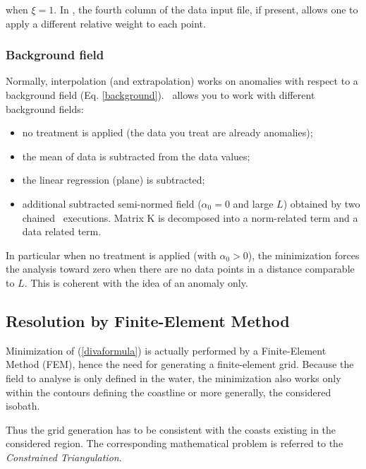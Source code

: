 when $\xi=1$. In  \diva, the fourth column of the data input file, if present, allows one 
to apply a different relative weight to each point. 


\subsubsection{Background field\label{sec:backgroundfield}}

Normally, interpolation (and extrapolation) works on anomalies with respect to a background field (Eq. \ref{background}). \diva\, allows you to work with different background fields:

\begin{itemize}
\item no treatment is applied (the data you treat are already anomalies);
\item the mean of data is subtracted from the data values;
\item the linear regression (plane) is subtracted;
\item additional subtracted semi-normed field ($\alpha_0=0$ and large $L$) obtained by two chained \diva\, executions. Matrix K is decomposed into a norm-related term and a data related term.
\end{itemize}

In particular when no treatment is applied (with $\alpha_0 > 0$), the minimization forces the analysis toward zero when there are no
data points in a distance comparable to $L$. This is coherent with the idea of an anomaly only.

\subsection{Resolution by Finite-Element Method}

Minimization of (\ref{divaformula}) is actually performed by a Finite-Element Method (FEM), hence the need for generating a finite-element grid. 
Because the field to analyse is only defined in the water, the minimization also works only within the contours defining the coastline or more generally, the considered isobath.

Thus the grid generation has to be consistent with the coasts existing in the considered region. The corresponding mathematical problem is referred to the \textit{Constrained Triangulation}. %


